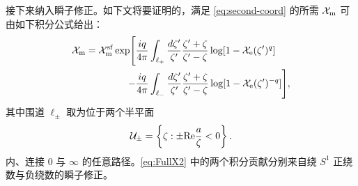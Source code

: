 接下来纳入瞬子修正。如下文将要证明的，满足 \eqref{eq:second-coord} 的所需 $\mathcal{X}_{\mathrm{m}}$ 可由如下积分公式给出：
\begin{equation}\label{eq:FullX2}
\begin{split}
\mathcal{X}_{\mathrm{m}} = \mathcal{X}_{\mathrm{m}}^{\mathrm{sf}} \exp\Biggl[ \frac{i q}{4\pi} & \int_{\ell_+} \frac{d \zeta'}{\zeta'}
\frac{\zeta' + \zeta}{\zeta' - \zeta} \log[1-\mathcal{X}_{\mathrm{e}}(\zeta')^q]  \\
- \frac{i q}{4\pi} & \int_{\ell_-}
 \frac{d \zeta'}{\zeta'} \frac{\zeta' + \zeta}{\zeta' - \zeta} \log[1-\mathcal{X}_{\mathrm{e}}(\zeta')^{-q}] \Biggr],
\end{split}
\end{equation}
其中围道 $\ell_\pm$ 取为位于两个半平面
\begin{equation}
\mathcal{U}_\pm = \left\{ \zeta: \pm {\rm Re} \frac{a}{\zeta}<0 \right\}.
\end{equation}
内、连接 $0$ 与 $\infty$ 的任意路径。\eqref{eq:FullX2} 中的两个积分贡献分别来自绕 $S^1$ 正绕数与负绕数的瞬子修正。

